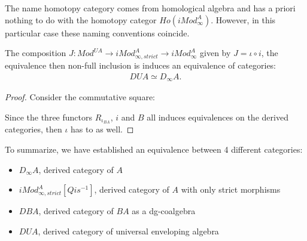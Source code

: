 \documentclass[../thesis.tex]{subfiles}
\begin{document}
            \begin{remark}
                The name homotopy category comes from homological algebra and has a priori nothing to do with the homotopy categor $Ho(iMod_\infty^A)$. However, in this particular case these naming conventions coincide.
            \end{remark}

            \begin{lemma}
                The composition $J : Mod^{UA} \to iMod_{\infty, strict}^A \to iMod_\infty^A$ given by $J = \iota \circ i$, the equivalence then non-full inclusion is induces an equivalence of categories:
                \begin{align*}
                    DUA \simeq D_\infty A.
                \end{align*}
            \end{lemma}

            \begin{proof}
                Consider the commutative square:
                \begin{center}
                \end{center}

                Since the three functors $R_{\iota_{BA}}$, $i$ and $B$ all induces equivalences on the derived categories, then $\iota$ has to as well.
            \end{proof}

            To summarize, we have established an equivalence between 4 different categories:
            \begin{itemize}
                \item $D_\infty A$, derived category of $A$
                \item $iMod_{\infty, strict}^A[Qis^{-1}]$, derived category of $A$ with only strict morphisms
                \item $DBA$, derived category of $BA$ as a dg-coalgebra
                \item $DUA$, derived category of universal enveloping algebra
            \end{itemize}
\end{document}
